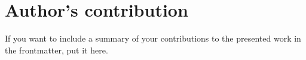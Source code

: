 

\chapter{Author's contribution}

If you want to include a summary of your contributions to the presented work in the frontmatter, put it here.


